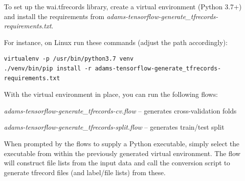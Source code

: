 \documentclass[a4paper]{book}
\begin{document}
To set up the wai.tfrecords library, create a virtual environment (Python 3.7+)
and install the requirements from \textit{adams-tensorflow-generate\_tfrecords-requirements.txt}.

\noindent For instance, on Linux run these commands (adjust the path accordingly):
{\scriptsize
\begin{verbatim}
virtualenv -p /usr/bin/python3.7 venv
./venv/bin/pip install -r adams-tensorflow-generate_tfrecords-requirements.txt
\end{verbatim}}

\noindent With the virtual environment in place, you can run the following flows:
\begin{tight_itemize}
  \item \textit{adams-tensorflow-generate\_tfrecords-cv.flow} -- generates cross-validation folds
  \item \textit{adams-tensorflow-generate\_tfrecords-split.flow} -- generates train/test split
\end{tight_itemize}
When prompted by the flows to supply a Python executable, simply select the
executable from within the previously generated virtual environment. The flow
will construct file lists from the input data and call the conversion script
to generate tfrecord files (and label/file lists) from these.



\end{document}
